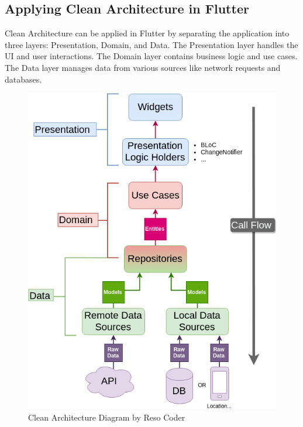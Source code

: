 \subsection{Applying Clean Architecture in Flutter}
Clean Architecture can be applied in Flutter by separating the application into three layers: Presentation, Domain, and Data. The Presentation layer handles the UI and user interactions. The Domain layer contains business logic and use cases. The Data layer manages data from various sources like network requests and databases.
\begin{figure}[H]
    \begin{minipage}{0.60\textwidth}
        \centering
        \includegraphics[width=1\linewidth]{../images/Clean-Architecture-Flutter-Diagram.png}
        \caption{Clean Architecture Diagram by Reso Coder\cite{resocoder2019course1}}\label{Fig:CADRESOCODER}
    \end{minipage}\hfill
    \begin {minipage}{0.38\textwidth}
    \centering

\end{minipage}
\end{figure}
